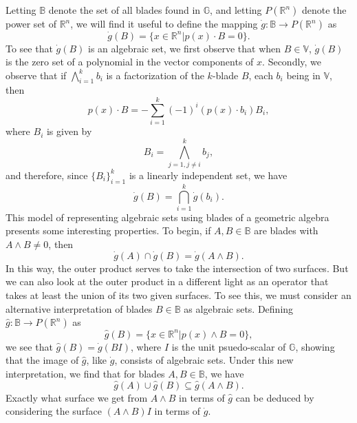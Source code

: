 \documentclass{ecgd-l}
\theoremstyle{definition}
\theoremstyle{remark}
\numberwithin{equation}{section}
\newcommand{\R}{\mathbb{R}}
\newcommand{\B}{\mathbb{B}}
\newcommand{\G}{\mathbb{G}}
\newcommand{\V}{\mathbb{V}}
\newcommand{\gd}{\dot{g}}
\newcommand{\gh}{\hat{g}}
\begin{document}
Letting $\B$ denote the set of all blades found in $\G$,
and letting $P(\R^n)$ denote the power set of $\R^n$,
we will find it useful to define the mapping $\gd:\B\to P(\R^n)$ as
\begin{equation}\label{equ_gd}
\gd(B) = \{x\in\R^n|p(x)\cdot B=0\}.
\end{equation}
To see that $\gd(B)$ is an algebraic set, we first observe that when $B\in\V$,
$\gd(B)$ is the zero set of a polynomial in the vector components of $x$.
Secondly, we observe that if $\bigwedge_{i=1}^k b_i$ is a factorization
of the $k$-blade $B$, each $b_i$ being in $\V$, then
\begin{equation*}
p(x)\cdot B = -\sum_{i=1}^k (-1)^i (p(x)\cdot b_i)B_i,
\end{equation*}
where $B_i$ is given by
\begin{equation*}
B_i = \bigwedge_{j=1,j\neq i}^k b_j,
\end{equation*}
and therefore, since $\{B_i\}_{i=1}^k$ is a linearly independent set, we have
\begin{equation*}
\gd(B) = \bigcap_{i=1}^k \gd(b_i).
\end{equation*}
This model of representing algebraic sets using blades of a geometric algebra presents
some interesting properties.  To begin, if $A,B\in\B$ are blades with $A\wedge B\neq 0$,
then
\begin{equation*}
\gd(A)\cap\gd(B)=\gd(A\wedge B).
\end{equation*}
In this way, the outer product serves to take the intersection of two surfaces.  But we can also
look at the outer product in a different light as an operator that takes at least the union
of its two given surfaces.  To see this, we must consider an alternative interpretation
of blades $B\in\B$ as algebraic sets.  Defining $\gh:\B\to P(\R^n)$ as
\begin{equation}\label{equ_gh}
\gh(B)=\{x\in\R^n|p(x)\wedge B=0\},
\end{equation}
we see that $\gh(B)=\gd(BI)$, where $I$ is the unit psuedo-scalar of $\G$, showing
that the image of $\gh$, like $\gd$, consists of algebraic sets.
Under this new interpretation, we find that for blades $A,B\in\B$, we have
\begin{equation*}
\gh(A)\cup\gh(B)\subseteq\gh(A\wedge B).
\end{equation*}
Exactly what surface we get from $A\wedge B$ in terms of $\gh$ can
be deduced by considering the surface $(A\wedge B)I$ in terms of $\gd$.
\end{document}
